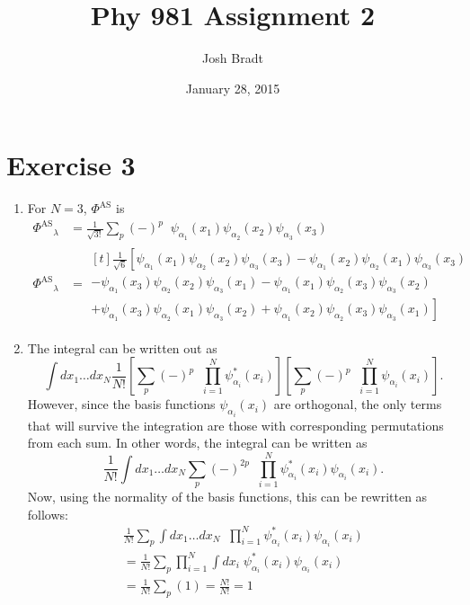 \documentclass{article}
\title{Phy 981 Assignment 2}
\author{Josh Bradt}
\date{January 28, 2015}
\DeclareMathOperator{\perm}{\mathit{\hat{P}}}
\newcommand{\phias}[0]{\ensuremath{\Phi^\text{AS}}}
\newcommand{\psisub}[2]{\ensuremath{\psi_{#1}\!\left(#2\right)}}
\newcommand{\psisubs}[2]{\ensuremath{\psi^*_{#1}\!\left(#2\right)}}
\begin{document}
\maketitle

\section*{Exercise 3}

	\begin{enumerate}
		\item For $N=3$, $\phias$ is
		\begin{align*}
			\phias_\lambda &= \frac{1}{\sqrt{3!}} \sum_p (-)^p \perm \psisub{\alpha_1}{x_1} \psisub{\alpha_2}{x_2} \psisub{\alpha_3}{x_3} \\
			\phias_\lambda &= \begin{multlined}[t]
				\frac{1}{\sqrt{6}} \left[ 
				\psisub{\alpha_1}{x_1} \psisub{\alpha_2}{x_2} \psisub{\alpha_3}{x_3}
				- \psisub{\alpha_1}{x_2} \psisub{\alpha_2}{x_1} \psisub{\alpha_3}{x_3} \right.\\
				- \psisub{\alpha_1}{x_3} \psisub{\alpha_2}{x_2} \psisub{\alpha_3}{x_1}
				- \psisub{\alpha_1}{x_1} \psisub{\alpha_2}{x_3} \psisub{\alpha_3}{x_2} \\
				\left. + \psisub{\alpha_1}{x_3} \psisub{\alpha_2}{x_1} \psisub{\alpha_3}{x_2}
				+ \psisub{\alpha_1}{x_2} \psisub{\alpha_2}{x_3} \psisub{\alpha_3}{x_1}
				\right]
				\end{multlined}
		\end{align*}

		\item The integral can be written out as
		\begin{equation*}
			\int dx_1 \dots dx_N \frac{1}{N!} \left[ \sum_p (-)^p \perm \prod_{i=1}^{N} \psisubs{\alpha_i}{x_i} \right] \left[ \sum_{p} (-)^{p} \perm \prod_{i=1}^{N} \psisub{\alpha_i}{x_i} \right].
		\end{equation*}
		However, since the basis functions $\psisub{\alpha_i}{x_i}$ are orthogonal, the only terms that will survive the integration are those with corresponding permutations from each sum. In other words, the integral can be written as
		\begin{equation*}
			\frac{1}{N!} \int dx_1 \dots dx_N \sum_p (-)^{2p} \perm \prod_{i=1}^{N} \psisubs{\alpha_i}{x_i}\psisub{\alpha_i}{x_i}.
		\end{equation*}
		Now, using the normality of the basis functions, this can be rewritten as follows:
		\begin{gather*}
			\frac{1}{N!} \sum_p \int dx_1 \dots dx_N \perm \prod_{i=1}^{N} \psisubs{\alpha_i}{x_i}\psisub{\alpha_i}{x_i} \\
			=\frac{1}{N!} \sum_p \prod_{i=1}^{N} \int dx_i\;\psisubs{\alpha_i}{x_i}\psisub{\alpha_i}{x_i} \\
			=\frac{1}{N!} \sum_p (1) = \frac{N!}{N!} = 1
		\end{gather*}


\end{enumerate}
\end{document}
